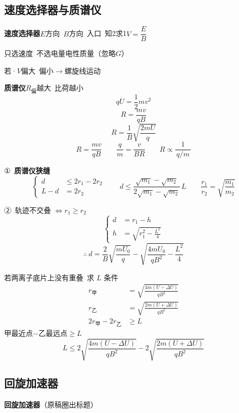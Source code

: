 \subsection{速度选择器与质谱仪}
\textbf{速度选择器}\quad $E$方向\ $B$方向\ 入口\ 知2求1\quad $V=\dfrac{E}{B}$

只选速度\ 不选电量电性质量（忽略$G$）

若·$V$偏大\ 偏小$\to$螺旋线运动

\textbf{质谱仪}\quad $R_{\text{偏}}$越大\ 比荷越小
\[ qU=\frac12 mv^2 \]
\[ R=\frac{mv}{qB} \]
\[ R=\frac1B\sqrt{\frac{2mU}{q}} \]
\[ R=\frac{mv}{qB}\qquad \frac{q}{m}=\frac{v}{BR}\qquad R\propto\frac{1}{\,q/m\,} \]

①\ \textbf{质谱仪狭缝}
\[
\left\{\begin{aligned}
d&\le 2r_{1}-2r_{2}\\
L-d&=2r_{2}
\end{aligned}\right.
\qquad d\le\frac{\sqrt{m_{1}}-\sqrt{m_{2}}}{2\sqrt{m_{1}}-\sqrt{m_{2}}}\,L
\qquad \frac{r_{1}}{r_{2}}=\sqrt{\frac{m_{1}}{m_{2}}}
\]

②\ 轨迹不交叠 $\Leftrightarrow r_{1}\ge r_{2}$
\[
\left\{\begin{aligned}
d&=r_{1}-h\\
h&=\sqrt{r_{1}^{2}-\frac{L^{2}}{4}}
\end{aligned}\right.
\]
\[
\therefore\ d=\frac{2}{B}\sqrt{\frac{mU_{0}}{q}}-\sqrt{\frac{4mU_{0}}{qB^{2}}-\frac{L^{2}}{4}}
\]

若两离子底片上没有重叠\ 求 $L$ 条件
\begin{align*}
r_{\text{甲}}&=\sqrt{\frac{4m(U-\Delta U)}{qB^{2}}}\\
r_{\text{乙}}&=\sqrt{\frac{2m(U+\Delta U)}{qB^{2}}}\\
2r_{\text{甲}}-2r_{\text{乙}}&\ge L
\end{align*}
甲最近点$-$乙最远点$\ge L$
\[
L\le2\sqrt{\frac{4m(U-\Delta U)}{qB^{2}}}-2\sqrt{\frac{2m(U+\Delta U)}{qB^{2}}}
\]

\subsection{回旋加速器}
\textbf{回旋加速器}（原稿圈出标题）

